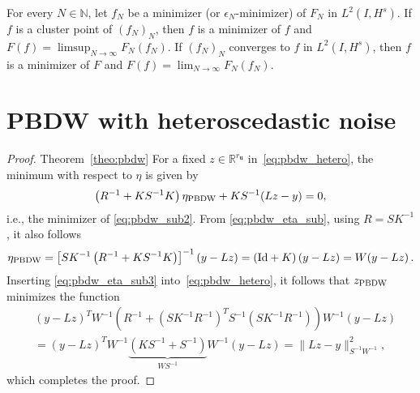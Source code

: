   \begin{corol} 
    For every $N\in\mathbb{N}$, let $f_N$ be a minimizer (or $\epsilon_N$-minimizer) of $F_N$ in $L^2(I, H^s)$. If $f$ is a cluster point of $(f_N)_N$, then $f$ is a minimizer of $f$ and $F(f)=\limsup_{N\to\infty}F_N(f_N)$. If $(f_N)_N$ converges to $f$ in $L^2(I, H^s)$, then $f$ is a minimizer of $F$ and $F(f)=\lim_{N\to\infty}F_N(f_N)$.
  \end{corol}

\section{PBDW with heteroscedastic noise}
\label{appendix:pbdw}
\begin{proof}{Theorem~\ref{theo:pbdw}}
  For a fixed $z\in\mathbb{R}^{r_{\mathbf u}}$ in~\eqref{eq:pbdw_hetero}, the minimum with respect to $\eta$ is given by
  \begin{equation}\label{eq:pbdw_eta_sub}
\left(R^{-1}+KS^{-1}K\right)\eta_{\rm PBDW} + KS^{-1}(Lz-y) = 0,
    \end{equation}
    i.e., the minimizer of \eqref{eq:pbdw_sub2}.
From \eqref{eq:pbdw_eta_sub}, using $R=SK^{-1}$, it also follows 
  \begin{equation}\label{eq:pbdw_eta_sub3}
     \eta_{\rm PBDW} = \left[ SK^{-1}\left(R^{-1}+KS^{-1}K\right) \right]^{-1}(y-Lz) = \left( \text{Id} + K \right)(y-Lz) = W (y-Lz)\,.
    \end{equation}
Inserting \eqref{eq:pbdw_eta_sub3} into~\eqref{eq:pbdw_hetero}, it follows that $z_{\rm PBDW}$ minimizes the function
  \begin{equation*}
  \begin{aligned}
    & (y-Lz)^TW^{-1}(R^{-1}+(SK^{-1}R^{-1})^TS^{-1}(SK^{-1}R^{-1}))W^{-1}(y-Lz) \\
    & = (y-Lz)^TW^{-1}\underbrace{\left(KS^{-1}+S^{-1}\right)}_{W S^{-1}}W^{-1}(y-Lz) = \lVert Lz-y\rVert^2_{S^{-1}W^{-1}},
  \end{aligned}
    \end{equation*}
    which completes the proof.
\end{proof}

